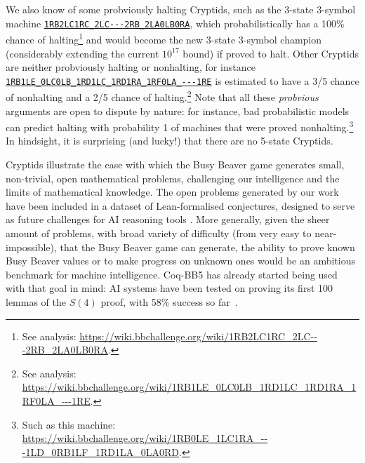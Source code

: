 \documentclass[letterpaper,british,11pt]{article}
\theoremstyle{definition} %
\numberwithin{equation}{section}
\theoremstyle{definition} %
\newcommand{\tm}[1]{\href{https://bbchallenge.org/#1}{\texttt{\nolinkurl{#1}}}}
\newcommand{\CoqBB}{Coq-BB5\xspace}
\begin{document}
We also know of some probviously halting Cryptids, such as the 3-state 3-symbol machine \tm{1RB2LC1RC_2LC---2RB_2LA0LB0RA}, which probabilistically  has a 100\% chance of halting\footnote{See analysis: {\scriptsize \url{https://wiki.bbchallenge.org/wiki/1RB2LC1RC_2LC---2RB_2LA0LB0RA}}.} and would become the new 3-state 3-symbol champion (considerably extending the current $10^{17}$ bound) if proved to halt. Other Cryptids are neither probviously halting or nonhalting, for instance \tm{1RB1LE_0LC0LB_1RD1LC_1RD1RA_1RF0LA_---1RE} is estimated to have a 3/5 chance of nonhalting and a 2/5 chance of halting.\footnote{See analysis: {\scriptsize \url{https://wiki.bbchallenge.org/wiki/1RB1LE_0LC0LB_1RD1LC_1RD1RA_1RF0LA_---1RE}}.} Note that all these \textit{probvious} arguments are open to dispute by nature: for instance, bad probabilistic models can predict halting with probability 1 of machines that were proved nonhalting.\footnote{Such as this machine: \url{https://wiki.bbchallenge.org/wiki/1RB0LE_1LC1RA_---1LD_0RB1LF_1RD1LA_0LA0RD}.} In hindsight, it is surprising (and lucky!) that there are no 5-state Cryptids.

Cryptids illustrate the ease with which the Busy Beaver game generates small, non-trivial, open mathematical problems, challenging our intelligence and the limits of mathematical knowledge. The open problems generated by our work have been included in a dataset of Lean-formalised conjectures, designed to serve as future challenges for AI reasoning tools \cite{google-deepmind-formal-conjectures}. More generally, given the sheer amount of problems, with broad variety of difficulty (from very easy to near-impossible), that the Busy Beaver game can generate, the ability to prove known Busy Beaver values or to make progress on unknown ones would be an ambitious benchmark for machine intelligence. \CoqBB has already started being used with that goal in mind: AI systems have been tested on proving its first 100 lemmas of the $S(4)$ proof, with 58\% success so far~\cite{teodorescu2024nlir}.
\end{document}
